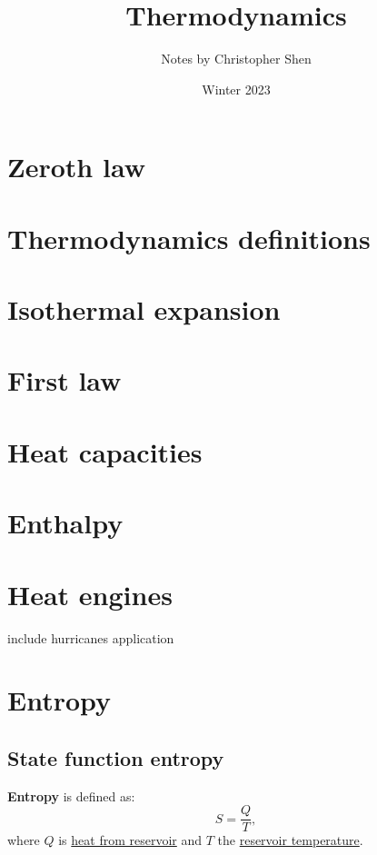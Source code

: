 \documentclass{article}
\title{Thermodynamics}
\author{Notes by Christopher Shen}
\date{Winter 2023}
\begin{document}
\maketitle
\newpage

\tableofcontents
\newpage

\pagestyle{fancy}
\fancyhead{}

\section{Zeroth law}


\section{Thermodynamics definitions}


\section{Isothermal expansion}


\section{First law}

\newpage

\section{Heat capacities}

\newpage

\section{Enthalpy}


\section{Heat engines}
include hurricanes application

\newpage

\section{Entropy}

\subsection{State function entropy}
\textbf{Entropy} is defined as:
$$S=\frac{Q}{T},$$
where $Q$ is \underline{heat from reservoir} and $T$ the \underline{reservoir temperature}.
\end{document}
